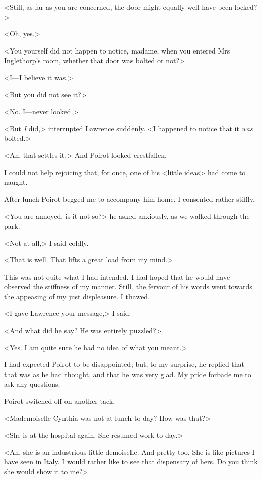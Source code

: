  <Still, as far as you are concerned, the door might equally well have been locked?> 

 <Oh, yes.> 

 <You yourself did not happen to notice, madame, when you entered Mrs Inglethorp's room, whether that door was bolted or not?> 

 <I—I believe it was.> 

 <But you did not see it?> 

 <No. I—never looked.> 

 <But \emph{I} did,> interrupted Lawrence suddenly. <I happened to notice that it \emph{was} bolted.> 

 <Ah, that settles it.> And Poirot looked crestfallen. 

 I could not help rejoicing that, for once, one of his <little ideas> had come to naught. 

 After lunch Poirot begged me to accompany him home. I consented rather stiffly. 

 <You are annoyed, is it not so?> he asked anxiously, as we walked through the park. 

 <Not at all,> I said coldly. 

 <That is well. That lifts a great load from my mind.> 

 This was not quite what I had intended. I had hoped that he would have observed the stiffness of my manner. Still, the fervour of his words went towards the appeasing of my just displeasure. I thawed. 

 <I gave Lawrence your message,> I said. 

 <And what did he say? He was entirely puzzled?> 

 <Yes. I am quite sure he had no idea of what you meant.> 

 I had expected Poirot to be disappointed; but, to my surprise, he replied that that was as he had thought, and that he was very glad. My pride forbade me to ask any questions. 

 Poirot switched off on another tack. 

 <Mademoiselle Cynthia was not at lunch to-day? How was that?> 

 <She is at the hospital again. She resumed work to-day.> 

 <Ah, she is an industrious little demoiselle. And pretty too. She is like pictures I have seen in Italy. I would rather like to see that dispensary of hers. Do you think she would show it to me?> 

